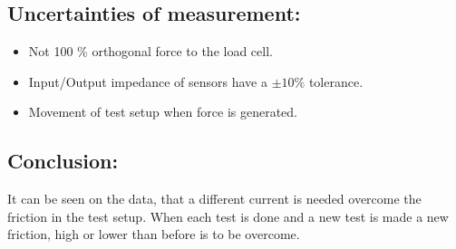 %

\subsection*{Uncertainties of measurement:}
\begin{itemize}
\item Not 100 \% orthogonal force to the load cell.
\item Input/Output impedance of sensors have a $\pm 10 \%$ tolerance.
\item Movement of test setup when force is generated.
\end{itemize}

\subsection*{Conclusion:}
It can be seen on the data, that a different current is needed overcome the friction in the test setup. When each test is done and a new test is made a new friction, high or lower than before is to be overcome. 
